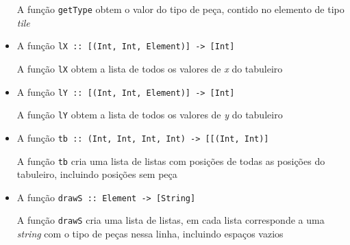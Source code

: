 \begin{itemize}
\begin{description}
\item[A função \texttt{getType} obtem o valor do tipo de peça, contido no elemento de tipo \emph{tile}]
\end{description}
\item A função \texttt{lX :: [(Int, Int, Element)] -> [Int]}
\begin{description}
\item[A função \texttt{lX} obtem a lista de todos os valores de \emph{x} do tabuleiro]
\end{description}
\item A função \texttt{lY :: [(Int, Int, Element)] -> [Int]}
\begin{description}
\item[A função  \texttt{lY} obtem a lista de todos os valores de \emph{y} do tabuleiro]
\end{description}
\item A função \texttt{tb :: (Int, Int, Int, Int)  -> [[(Int, Int)]}
\begin{description}
\item[A função \texttt{tb} cria uma lista de listas com posições de todas as posições do tabuleiro, incluindo posições sem peça]
\end{description}
\item A função \texttt{drawS :: Element -> [String]}
\begin{description}
\item[A função \texttt{drawS} cria uma lista de listas, em cada lista corresponde a uma \emph{string} com o tipo de peças nessa linha, incluindo espaços vazios]
\end{description}
\end{itemize}

